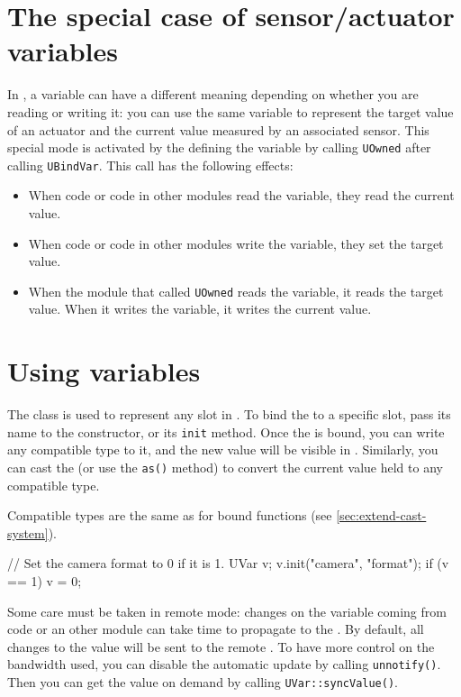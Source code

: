 \section{The special case of sensor/actuator variables}

In \urbi, a variable can have a different meaning depending on whether you
are reading or writing it: you can use the same variable to represent the
target value of an actuator and the current value measured by an associated
sensor. This special mode is activated by the \UObject defining the variable
by calling \lstinline{UOwned} after calling \lstinline{UBindVar}. This call
has the following effects:
\begin{itemize}
\item When \urbi code or code in other modules read the variable, they read
  the current value.
\item When \urbi code or code in other modules write the variable, they set
  the target value.
\item When the module that called \lstinline|UOwned| reads the variable, it
  reads the target value. When it writes the variable, it writes the current
  value.
\end{itemize}

\section{Using \urbi variables}

The \Cxx class \UVar is used to represent any \urbi slot in \Cxx.  To bind
the \UVar to a specific slot, pass its name to the \UVar constructor, or its
\lstinline|init| method.  Once the \UVar is bound, you can write any
compatible type to it, and the new value will be visible in \us.  Similarly,
you can cast the \UVar (or use the \lstinline{as()} method) to convert the
current \us value held to any compatible type.

Compatible types are the same as for bound functions (see
\autoref{sec:extend-cast-system}).

\begin{cxx}
// Set the camera format to 0 if it is 1.
UVar v;
v.init("camera", "format");
if (v == 1)
 v = 0;
\end{cxx}

Some care must be taken in remote mode: changes on the variable coming from
\urbi code or an other module can take time to propagate to the \UVar. By
default, all changes to the value will be sent to the remote \UObject. To
have more control on the bandwidth used, you can disable the automatic
update by calling \lstinline|unnotify()|. Then you can get the value on
demand by calling \lstinline|UVar::syncValue()|.

